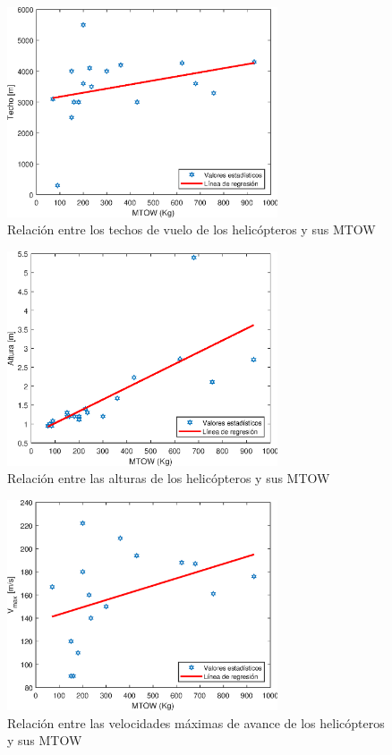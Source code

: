 \begin{figure}
	\centering
	\includegraphics[width=80mm]{graficos/analtecho}
	\caption{Relación entre los techos de vuelo de los helicópteros y sus MTOW}
\end{figure}
\begin{figure}
	\centering
	\includegraphics[width=80mm]{graficos/analalt}
	\caption{Relación entre las alturas de los helicópteros y sus MTOW}
\end{figure}
\begin{figure}
	\centering
	\includegraphics[width=80mm]{graficos/analv}
	\caption{Relación entre las velocidades máximas de avance de los helicópteros y sus MTOW}
\end{figure}
